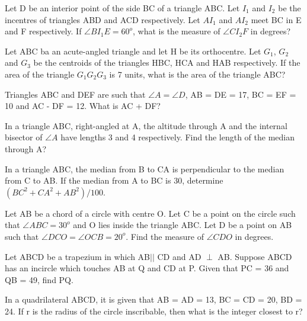 \item Let D be an interior point of the side BC of a triangle ABC. Let $I_1$ and $I_2$ be the incentres of triangles ABD and ACD respectively. Let $AI_1$ and $AI_2$ meet BC in E and F respectively. If $\angle BI_1E = 60^{o}$, what is the measure of $\angle CI_2F$ in degrees?

\item Let ABC ba an acute-angled triangle and let H be its orthocentre. Let $G_1$, $G_2$ and $G_3$ be the centroids of the triangles HBC, HCA and HAB respectively. If the area of the triangle $G_1G_2G_3$ is 7 units, what is the area of the triangle ABC?

\item Triangles ABC and DEF are such that $\angle A = \angle D$, AB  = DE = 17, BC = EF = 10  and AC - DF = 12. What is AC + DF?

\item In a triangle ABC, right-angled at A, the altitude through A and the internal bisector of $\angle A$ have lengths 3 and 4 respectively. Find the length of the median through A?

\item In a triangle ABC, the median from B to CA is perpendicular to the median from C to AB. If the median from A to BC is 30, determine $(BC^2 + CA^2 + AB^2)/100$.

\item Let AB be a chord of a circle with centre O. Let C be a point on the circle such that $\angle ABC = 30^{o}$ and O lies inside the triangle ABC. Let D be a point on AB such that $\angle DCO = \angle OCB = 20^{o}$. Find the measure of 
$\angle CDO$ in degrees.

\item Let ABCD be a trapezium in which AB$||$ CD and AD $\perp$ AB. Suppose ABCD has  an incircle which touches AB at Q and CD at P. Given that PC = 36 and QB = 49, find PQ.

\item In a quadrilateral ABCD, it is given that AB = AD = 13, BC = CD = 20, BD = 24. If r is the radius of the circle inscribable, then what is the integer closest to r?
